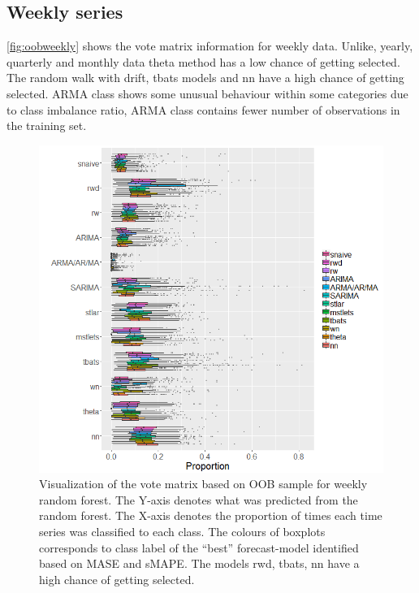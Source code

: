 \documentclass[11pt,a4paper,]{article}
\begin{document}
\hypertarget{weekly-series}{%
\subsection{Weekly series}\label{weekly-series}}

\autoref{fig:oobweekly} shows the vote matrix information for weekly data. Unlike, yearly, quarterly and monthly data theta method has a low chance of getting selected. The random walk with drift, tbats models and nn have a high chance of getting selected. ARMA class shows some unusual behaviour within some categories due to class imbalance ratio, ARMA class contains fewer number of observations in the training set.

\begin{figure}
\centering
\includegraphics{figures/oobweekly-1.png}
\caption{\label{fig:oobweekly}Visualization of the vote matrix based on OOB sample for weekly random forest. The Y-axis denotes what was predicted from the random forest. The X-axis denotes the proportion of times each time series was classified to each class. The colours of boxplots corresponds to class label of the ``best'' forecast-model identified based on MASE and sMAPE. The models rwd, tbats, nn have a high chance of getting selected.}
\end{figure}
\end{document}
